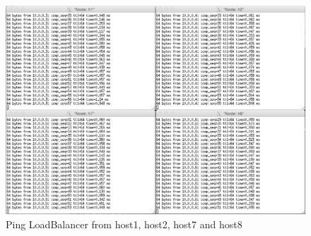 \documentclass[a4paper]{article}
\begin{document}
\begin{figure}[H]
  \centering
    \includegraphics[scale=.44]{ping_lb.png}
  \caption{Ping LoadBalancer from host1, host2, host7 and host8}
\end{figure}
\end{document}
